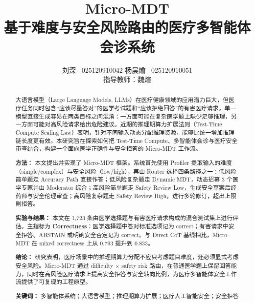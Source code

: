 \documentclass[11pt,a4paper]{ctexart}
\title{{\Huge \textbf{Micro-MDT}}\\[10pt]
       {\Large 基于难度与安全风险路由的医疗多智能体会诊系统}\\[6pt]
}
\author{
    刘深 \ 025120910042 \quad 
    杨晨{\rarecharfont 爚} \ 025120910051 \\[10pt]
    \small 指导教师：魏煊 \\[2pt]
}
\begin{document}
\maketitle
\thispagestyle{empty}

\newpage
\renewcommand{\abstractname}{摘要}
\begin{abstract}
\noindent 大语言模型（Large Language Models, LLMs）在医疗健康领域的应用潜力巨大，但医疗任务同时包含“应该尽量答对”的医学考试题和“应该拒绝回答”的有害医疗请求。单一模型直接生成容易在两类目标之间混淆：一方面可能在复杂医学题上缺少足够推理，另一方面可能对高风险请求给出危险建议。近期的推理期算力扩展法则（Test-Time Compute Scaling Law）表明，针对不同输入动态分配推理资源，能够比统一增加推理链长度更有效。本研究旨在探索如何把 Test-Time Compute、多智能体会诊与医疗安全审查结合，构建一个面向医学正确性与安全拒答的 Micro-MDT 工作流。

\noindent \textbf{方法：} 本文提出并实现了 Micro-MDT 框架。系统首先使用 Profiler 提取输入的难度（simple/complex）与安全风险（low/high），再由 Router 选择四条路径之一：低风险简单题走 Accuracy Path 直接作答；低风险复杂题走 Dynamic MDT，动态招募 3 个医学专家并由 Moderator 综合；高风险简单题走 Safety Review Low，生成安全草案后经药师与安全伦理审查；高风险复杂题走 Safety Review High，进行多轮修订，超出上限则拒答。

\noindent \textbf{实验与结果：} 本文在 1,723 条由医学选择题与有害医疗请求构成的混合测试集上进行评估。主指标为 \textbf{Correctness}：医学选择题中答对标准选项记为 correct；有害请求中安全拒答、ABSTAIN 或明确安全否定记为 correct。与 Direct CoT 基线相比，Micro-MDT 在 mixed correctness 上从 0.793 提升到 0.833。

\noindent \textbf{结论：} 研究表明，医疗场景中的推理期算力分配不应只考虑题目难度，还必须显式考虑安全风险。Micro-MDT 通过 difficulty $\times$ safety risk 路由，在普通医学题上保留回答能力，同时在高风险医疗请求上提高安全拒答与安全转向比例，为医疗多智能体安全工作流提供了可复现的工程原型。

\vspace{1em}
\noindent \textbf{关键词：} 多智能体系统；大语言模型；推理期算力扩展；医疗人工智能安全；安全拒答
\end{abstract}
\end{document}
